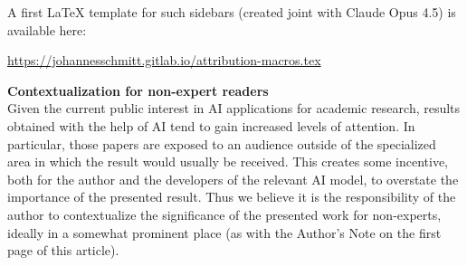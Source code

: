 \documentclass[12pt,reqno]{amsart}
\theoremstyle{definition}
\newcommand{\aiinline}[1]{{\color{aicolor}\uwave{#1}}}
\begin{document}
\begin{humanparagraph}
A first LaTeX template for such sidebars (created joint\aiinline{ly} with Claude Opus 4.5) is available here:
\begin{center}
    \url{https://johannesschmitt.gitlab.io/attribution-macros.tex}
\end{center}

\vspace{5pt}
\noindent \textbf{Contextualization for non-expert readers}\\
Given the current public interest in AI applications for academic research, results obtained with the help of AI tend to gain increased levels of attention. In particular, those papers are exposed to  an audience outside of the specialized area in which the result would usually be received. 
This creates some incentive, both for the author and the developers of the relevant AI model, to overstate the importance of the presented result. Thus we believe it is the responsibility of the author to contextualize the significance of the presented work for non-experts, ideally in a somewhat prominent place (as with the Author's Note on the first page of this article).
\end{humanparagraph}








\end{document}

